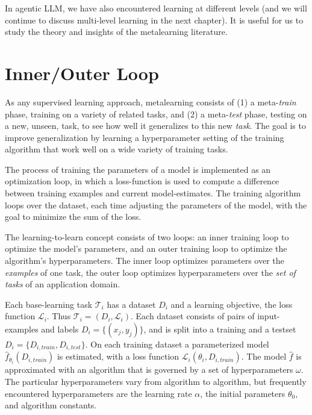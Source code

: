 In agentic LLM, we have also  encountered learning at different levels (and we will continue to discuss multi-level learning in the next chapter). It is  useful for us to study the  theory and insights of the metalearning literature.





\section{Inner/Outer Loop}

As any supervised learning approach, metalearning consists  of  (1) a meta-{\em train} phase, training on a variety of related tasks, and (2) a meta-{\em test} phase, testing on a new, unseen, task, to see how well it generalizes to this new {\em task}. The goal is to improve generalization by learning a hyperparameter setting of the training algorithm that work well on a wide variety of training tasks.

The process of training the parameters of a model is  implemented as an optimization loop, in which a loss-function is used to compute a difference between training examples and current model-estimates. The training algorithm loops over the dataset, each time adjusting the parameters of the model, with the goal to minimize the sum of the loss. 

The learning-to-learn concept consists of two loops: an inner training loop to optimize the model's parameters, and an outer training loop to optimize the algorithm's hyperparameters. The inner loop optimizes parameters over the {\em examples} of one task, the outer loop optimizes hyperparameters over the {\em set of tasks} of an application domain. 


Each  
base-learning task $\mathcal{T}_i$  has  a dataset
$D_i$  and a learning 
objective, the loss function $\mathcal{L}_i$. Thus  $\mathcal{T}_i=(D_i,
\mathcal{L}_i)$. Each dataset consists of pairs of input-examples and labels
$D_i=\{(x_j,y_j)\}$, and is split into a training and a testset $D_i=\{D_{i,train},D_{i,test}\}$. On each training dataset a parameterized model
$\hat{f}_{\theta_i}(D_{i,{train}})$ is estimated, with a loss function
$\mathcal{L}_i(\theta_i,D_{i,{train}})$.  The model $\hat{f}$ is approximated
with an algorithm that is governed by a set of hyperparameters
$\omega$. The particular hyperparameters vary from algorithm to
algorithm, but frequently encountered hyperparameters are the learning
rate $\alpha$,  the initial  parameters $\theta_0$, and  algorithm
constants. 



